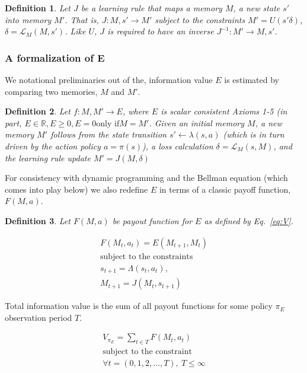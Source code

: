 \documentclass[9pt,twocolumn,twoside]{pnas-new}
\newtheorem{definition}{Definition}
\begin{document}
\begin{definition}
    Let $J$ be a learning rule that maps a memory $M$, a new state $s'$ into memory $M'$. That is, $J : M, s' \rightarrow M'$ subject to the constraints  $M' = U(s' \delta)$, $\delta = \mathcal{L}_M(M, s')$. Like $U$, $J$ is required to have an inverse $J^{-1} : M' \rightarrow M, s'$.
\end{definition}

\subsubsection*{A formalization of E}
We notational preliminaries out of the, information value $E$ is estimated by comparing two memories, $M$ and $M'$.

\begin{definition}
      Let $f : M, M' \rightarrow E$, where $E$ is scalar consistent Axioms 1-5 (in part, $E \in \mathbb{R}, E \ge 0, E = 0 \text{only if} M = M'$. Given an initial memory $M$, a new memory $M'$ follows from the state transition $s' \leftarrow \lambda (s, a)$ (which is in turn driven by the action policy $a = \pi(s)$), a loss calculation $\delta = \mathcal{L}_M(s, M)$, and the learning rule update $M' = J(M, \delta)$
\end{definition}

For consistency with dynamic programming and the Bellman equation (which comes into play below) we also redefine $E$ in terms of a classic payoff function, $F(M, a)$.

\begin{definition}
    Let $F(M, a)$ be payout function for $E$ as defined by Eq.~\ref{eq:V}.
\end{definition}

\begin{equation}
    \begin{split} \label{eq:V}
    F(M_t, a_t) = E(M_{t+1}, M_{t})\\
    \text{subject to the constraints} \\
    s_{t+1} = \Lambda(s_t, a_t),\\ 
    M_{t+1} = J(M_t, s_{t+1})
    \end{split} 
\end{equation}

Total information value is the sum of all payout functions for some policy $\pi_E$ observation period $T$. 

\begin{equation} \label{eq:V}
    \begin{split}
        V_{\pi_E} = \sum_{t \in T} F(M_t, a_t)\\
        \text{subject to the constraint}\\
        \forall t = (0,1,2,\ldots, T),\ T \leq \infty
    \end{split}
\end{equation}
\end{document}
